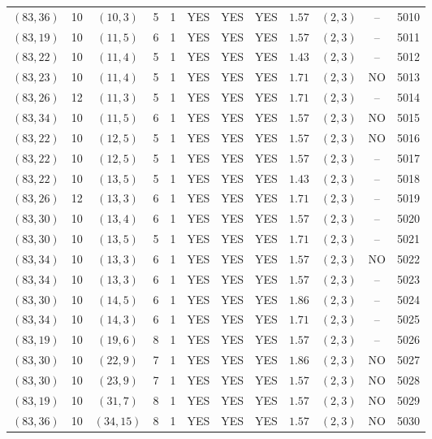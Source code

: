 \begin{longtable}{|c|c|c|c|c|c|c|c|c|c|c|c|}
$(83,36)$ & 10 & $(10,3)$ & 5 & 1 & YES & YES & YES & $1.57$ & $(2,3)$ & -- & 5010\\
$(83,19)$ & 10 & $(11,5)$ & 6 & 1 & YES & YES & YES & $1.57$ & $(2,3)$ & -- & 5011\\
$(83,22)$ & 10 & $(11,4)$ & 5 & 1 & YES & YES & YES & $1.43$ & $(2,3)$ & -- & 5012\\
$(83,23)$ & 10 & $(11,4)$ & 5 & 1 & YES & YES & YES & $1.71$ & $(2,3)$ & NO & 5013\\
$(83,26)$ & 12 & $(11,3)$ & 5 & 1 & YES & YES & YES & $1.71$ & $(2,3)$ & -- & 5014\\
$(83,34)$ & 10 & $(11,5)$ & 6 & 1 & YES & YES & YES & $1.57$ & $(2,3)$ & NO & 5015\\
$(83,22)$ & 10 & $(12,5)$ & 5 & 1 & YES & YES & YES & $1.57$ & $(2,3)$ & NO & 5016\\
$(83,22)$ & 10 & $(12,5)$ & 5 & 1 & YES & YES & YES & $1.57$ & $(2,3)$ & -- & 5017\\
$(83,22)$ & 10 & $(13,5)$ & 5 & 1 & YES & YES & YES & $1.43$ & $(2,3)$ & -- & 5018\\
$(83,26)$ & 12 & $(13,3)$ & 6 & 1 & YES & YES & YES & $1.71$ & $(2,3)$ & -- & 5019\\
$(83,30)$ & 10 & $(13,4)$ & 6 & 1 & YES & YES & YES & $1.57$ & $(2,3)$ & -- & 5020\\
$(83,30)$ & 10 & $(13,5)$ & 5 & 1 & YES & YES & YES & $1.71$ & $(2,3)$ & -- & 5021\\
$(83,34)$ & 10 & $(13,3)$ & 6 & 1 & YES & YES & YES & $1.57$ & $(2,3)$ & NO & 5022\\
$(83,34)$ & 10 & $(13,3)$ & 6 & 1 & YES & YES & YES & $1.57$ & $(2,3)$ & -- & 5023\\
$(83,30)$ & 10 & $(14,5)$ & 6 & 1 & YES & YES & YES & $1.86$ & $(2,3)$ & -- & 5024\\
$(83,34)$ & 10 & $(14,3)$ & 6 & 1 & YES & YES & YES & $1.71$ & $(2,3)$ & -- & 5025\\
$(83,19)$ & 10 & $(19,6)$ & 8 & 1 & YES & YES & YES & $1.57$ & $(2,3)$ & -- & 5026\\
$(83,30)$ & 10 & $(22,9)$ & 7 & 1 & YES & YES & YES & $1.86$ & $(2,3)$ & NO & 5027\\
$(83,30)$ & 10 & $(23,9)$ & 7 & 1 & YES & YES & YES & $1.57$ & $(2,3)$ & NO & 5028\\
$(83,19)$ & 10 & $(31,7)$ & 8 & 1 & YES & YES & YES & $1.57$ & $(2,3)$ & NO & 5029\\
$(83,36)$ & 10 & $(34,15)$ & 8 & 1 & YES & YES & YES & $1.57$ & $(2,3)$ & NO & 5030\\

\end{longtable}
